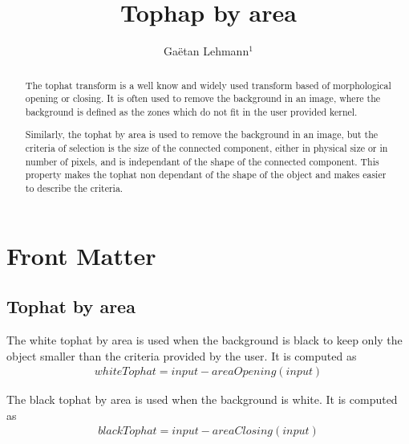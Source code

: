 \documentclass{InsightArticle}
\title{Tophap by area}
\author{Ga\"etan Lehmann{$^1$}}
\newcommand{\IJhandlerIDnumber}{3228}
\begin{document}
%
% 
\IJhandlefooter{\IJhandlerIDnumber}

\maketitle

\ifhtml
\chapter*{Front Matter\label{front}}
\fi


\begin{abstract}
\noindent
The tophat transform is a well know and widely used transform based of morphological opening or closing.
It is often used to remove the background in an image, where the background is defined as the zones which do not fit in the user provided kernel.

Similarly, the tophat by area is used to remove the background in an image, but the criteria of selection is the size of the connected component,
either in physical size or in number of pixels, and is independant of the shape of the connected component. This property makes the tophat non
dependant of the shape of the object and makes easier to describe the criteria.
\end{abstract}

\IJhandlenote{\IJhandlerIDnumber}

\tableofcontents

\section{Tophat by area}

The white tophat by area is used when the background is black to keep only the object smaller than the criteria provided by the user.
It is computed as
\begin{eqnarray}
whiteTophat = input - areaOpening(input)
\end{eqnarray}

The black tophat by area is used when the background is white. It is computed as
\begin{eqnarray}
blackTophat = input - areaClosing(input)
\end{eqnarray}
\end{document}
